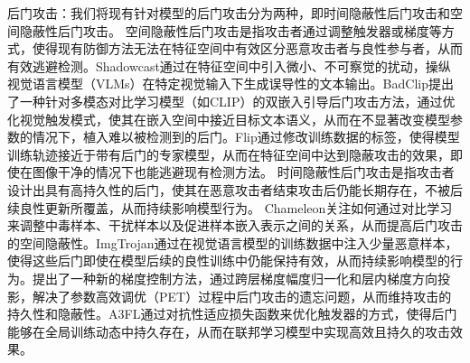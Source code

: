 \documentclass[lettersize,journal]{IEEEtran}
\begin{document}
后门攻击：我们将现有针对模型的后门攻击分为两种，即时间隐蔽性后门攻击和空间隐蔽性后门攻击。
空间隐蔽性后门攻击是指攻击者通过调整触发器或梯度等方式，使得现有防御方法无法在特征空间中有效区分恶意攻击者与良性参与者，从而有效逃避检测。Shadowcast\cite{xu2024shadowcast}通过在特征空间中引入微小、不可察觉的扰动，操纵视觉语言模型（VLMs）在特定视觉输入下生成误导性的文本输出。BadClip\cite{liang2024badclip}提出了一种针对多模态对比学习模型（如CLIP）的双嵌入引导后门攻击方法，通过优化视觉触发模式，使其在嵌入空间中接近目标文本语义，从而在不显著改变模型参数的情况下，植入难以被检测到的后门。Flip\cite{jha2023label}通过修改训练数据的标签，使得模型训练轨迹接近于带有后门的专家模型，从而在特征空间中达到隐蔽攻击的效果，即使在图像干净的情况下也能逃避现有检测方法。
时间隐蔽性后门攻击是指攻击者设计出具有高持久性的后门，使其在恶意攻击者结束攻击后仍能长期存在，不被后续良性更新所覆盖，从而持续影响模型行为。 Chameleon\cite{dai2023chameleon}关注如何通过对比学习来调整中毒样本、干扰样本以及促进样本嵌入表示之间的关系，从而提高后门攻击的空间隐蔽性。ImgTrojan\cite{tao2024imgtrojan}通过在视觉语言模型的训练数据中注入少量恶意样本，使得这些后门即使在模型后续的良性训练中仍能保持有效，从而持续影响模型的行为。\cite{gu2023gradient}提出了一种新的梯度控制方法，通过跨层梯度幅度归一化和层内梯度方向投影，解决了参数高效调优（PET）过程中后门攻击的遗忘问题，从而维持攻击的持久性和隐蔽性。A3FL\cite{zhang2024a3fl}通过对抗性适应损失函数来优化触发器的方式，使得后门能够在全局训练动态中持久存在，从而在联邦学习模型中实现高效且持久的攻击效果。
\end{document}

